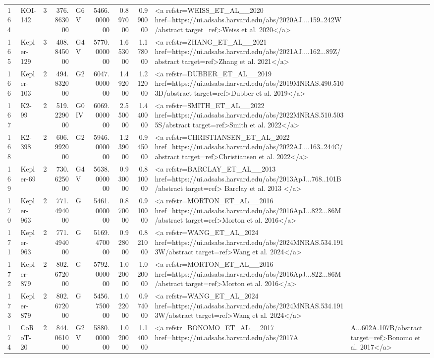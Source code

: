 \begin{tabular}{llrrlrrrl}
164 & KOI-142 & 3 & 376.863000 & G6 V & 5466.000000 & 0.897000 & 0.990000 & <a refstr=WEISS_ET_AL__2020 href=https://ui.adsabs.harvard.edu/abs/2020AJ....159..242W/abstract target=ref>Weiss et al. 2020</a> \\
165 & Kepler-129 & 3 & 408.845000 & G4 V & 5770.000000 & 1.653000 & 1.178000 & <a refstr=ZHANG_ET_AL__2021 href=https://ui.adsabs.harvard.edu/abs/2021AJ....162...89Z/abstract target=ref>Zhang et al. 2021</a> \\
166 & Kepler-103 & 2 & 494.832000 & G2 & 6047.000000 & 1.492000 & 1.212000 & <a refstr=DUBBER_ET_AL__2019 href=https://ui.adsabs.harvard.edu/abs/2019MNRAS.490.5103D/abstract target=ref>Dubber et al. 2019</a> \\
167 & K2-99 & 2 & 519.229000 & G0 IV & 6069.000000 & 2.550000 & 1.440000 & <a refstr=SMITH_ET_AL__2022 href=https://ui.adsabs.harvard.edu/abs/2022MNRAS.510.5035S/abstract target=ref>Smith et al. 2022</a> \\
168 & K2-398 & 2 & 606.992000 & G2 & 5946.000000 & 1.239000 & 0.945000 & <a refstr=CHRISTIANSEN_ET_AL_2022 href=https://ui.adsabs.harvard.edu/abs/2022AJ....163..244C/abstract target=ref>Christiansen et al. 2022</a> \\
169 & Kepler-69 & 2 & 730.625000 & G4 V & 5638.000000 & 0.930000 & 0.810000 & <a refstr=BARCLAY_ET_AL__2013 href=https://ui.adsabs.harvard.edu/abs/2013ApJ...768..101B/abstract target=ref> Barclay et al. 2013 </a> \\
170 & Kepler-963 & 2 & 771.494000 & G & 5461.000000 & 0.870000 & 0.910000 & <a refstr=MORTON_ET_AL__2016 href=https://ui.adsabs.harvard.edu/abs/2016ApJ...822...86M/abstract target=ref>Morton et al. 2016</a> \\
171 & Kepler-963 & 2 & 771.494000 & G & 5169.470000 & 0.928000 & 0.821000 & <a refstr=WANG_ET_AL_2024 href=https://ui.adsabs.harvard.edu/abs/2024MNRAS.534.1913W/abstract target=ref>Wang et al. 2024</a> \\
172 & Kepler-879 & 2 & 802.672000 & G & 5792.000000 & 1.020000 & 1.020000 & <a refstr=MORTON_ET_AL__2016 href=https://ui.adsabs.harvard.edu/abs/2016ApJ...822...86M/abstract target=ref>Morton et al. 2016</a> \\
173 & Kepler-879 & 2 & 802.672000 & G & 5456.750000 & 1.022000 & 0.974000 & <a refstr=WANG_ET_AL_2024 href=https://ui.adsabs.harvard.edu/abs/2024MNRAS.534.1913W/abstract target=ref>Wang et al. 2024</a> \\
174 & CoRoT-20 & 2 & 844.061000 & G2 V & 5880.000000 & 1.020000 & 1.140000 & <a refstr=BONOMO_ET_AL__2017 href=https://ui.adsabs.harvard.edu/abs/2017A&A...602A.107B/abstract target=ref>Bonomo et al. 2017</a> \\

\end{tabular}

